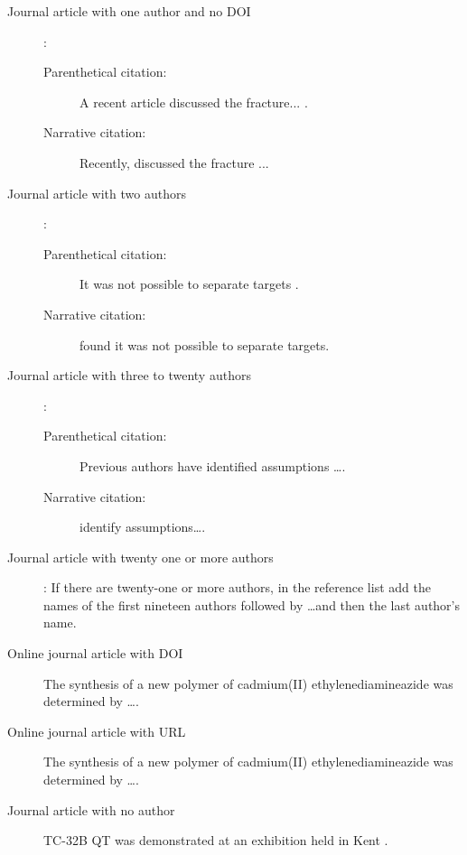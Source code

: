 \begin{description}
\item[Journal article with one author and no DOI]:
\begin{description}
\item[Parenthetical citation:] A recent article discussed the fracture... \parencite{hutchinson_fracture_2010}.
\item[Narrative citation:] Recently, \textcite{hutchinson_fracture_2010} discussed the fracture ...
\end{description}

\item[Journal article with two authors]:
\begin{description}
\item[Parenthetical citation:] It was not possible to separate targets \parencite{yang_perceptual_2016}.
\item[Narrative citation:]  \textcite{yang_perceptual_2016} found it was not possible to separate targets.
\end{description}

\item[Journal article with three to twenty authors]:
\begin{description}
\item[Parenthetical citation:] Previous authors \parencite{langley_process_2013} have identified assumptions \ldots .
\item[Narrative citation:]  \textcite{langley_process_2013} identify assumptions\ldots .
\end{description}

\item[Journal article with twenty one or more authors]:
If there are twenty-one or more authors, in the reference list add the names of the first nineteen
authors followed by \ldots and then the last author’s name.

\item[Online journal article with DOI] The synthesis of a new polymer of
cadmium(II) \linebreak ethylenediamineazide was determined by \ldots \parencite{yang_preparation_2010}. 
\item[Online journal article with URL] The synthesis of a new polymer of
cadmium(II) \linebreak ethylenediamineazide was determined by \ldots \parencite{yang_another_2010}.
\item[Journal article with no author]  TC-32B QT was demonstrated at an
exhibition held in Kent \cite{anon_first_2005}.
\end{description}

